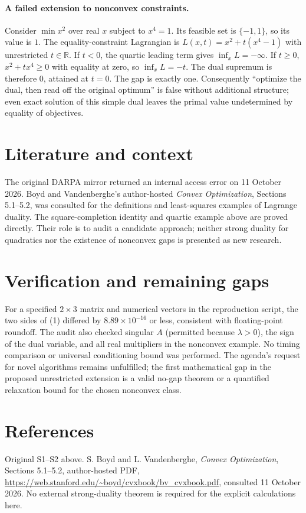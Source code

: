 \documentclass[11pt]{article}
\begin{document}
\paragraph{A failed extension to nonconvex constraints.}
Consider $\min x^2$ over real $x$ subject to $x^4=1$. Its feasible set is $\{-1,1\}$, so its value is $1$. The equality-constraint Lagrangian is $L(x,t)=x^2+t(x^4-1)$ with unrestricted $t\in\mathbb R$. If $t<0$, the quartic leading term gives $\inf_xL=-\infty$. If $t\ge0$, $x^2+tx^4\ge0$ with equality at zero, so $\inf_xL=-t$. The dual supremum is therefore $0$, attained at $t=0$. The gap is exactly one. Consequently ``optimize the dual, then read off the original optimum'' is false without additional structure; even exact solution of this simple dual leaves the primal value undetermined by equality of objectives.

\section{Literature and context}
The original DARPA mirror returned an internal access error on 11 October 2026. Boyd and Vandenberghe's author-hosted \emph{Convex Optimization}, Sections 5.1--5.2, was consulted for the definitions and least-squares examples of Lagrange duality. The square-completion identity and quartic example above are proved directly. Their role is to audit a candidate approach; neither strong duality for quadratics nor the existence of nonconvex gaps is presented as new research.

\section{Verification and remaining gaps}
For a specified $2\times3$ matrix and numerical vectors in the reproduction script, the two sides of (1) differed by $8.89\times10^{-16}$ or less, consistent with floating-point roundoff. The audit also checked singular $A$ (permitted because $\lambda>0$), the sign of the dual variable, and all real multipliers in the nonconvex example. No timing comparison or universal conditioning bound was performed. The agenda's request for novel algorithms remains unfulfilled; the first mathematical gap in the proposed unrestricted extension is a valid no-gap theorem or a quantified relaxation bound for the chosen nonconvex class.

\section{References}
Original S1--S2 above. S. Boyd and L. Vandenberghe, \emph{Convex Optimization}, Sections 5.1--5.2, author-hosted PDF, \url{https://web.stanford.edu/~boyd/cvxbook/bv_cvxbook.pdf}, consulted 11 October 2026. No external strong-duality theorem is required for the explicit calculations here.
\end{document}
